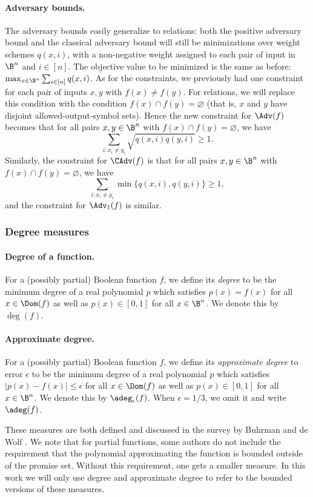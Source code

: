 \paragraph{Adversary bounds.}
The adversary bounds easily generalize to relations:
both the positive adversary bound and the classical adversary
bound will still be minimizations over weight schemes
$q(x,i)$, with a non-negative weight assigned to each pair of
input in $\B^n$ and $i\in[n]$. The objective value to be
minimized is the same as before:
$\max_{x\in\B^n}\sum_{i\in[n]} q(x,i)$.
As for the constraints, we previously had one constraint
for each pair of inputs $x,y$ with $f(x)\ne f(y)$.
For relations, we will replace this condition with the condition
$f(x)\cap f(y)=\varnothing$ (that is, $x$ and $y$ have
disjoint allowed-output-symbol sets). Hence the new constraint
for $\Adv(f)$ becomes that for all pairs $x,y\in\B^n$
with $f(x)\cap f(y)=\varnothing$, we have
\[\sum_{i:x_i\ne y_i}\sqrt{q(x,i)q(y,i)}\ge 1.\]
Similarly, the constraint for $\CAdv(f)$ is that for all pairs
$x,y\in\B^n$ with $f(x)\cap f(y)=\varnothing$, we have
\[\sum_{i:x_i\ne y_i}\min\{q(x,i),q(y,i)\}\ge 1,\]
and the constraint for $\Adv_1(f)$ is similar.



\subsubsection{Degree measures}

\paragraph{Degree of a function.} For a
(possibly partial) Boolean function $f$, we define
its \emph{degree} to be the minimum degree of a real
polynomial $p$ which satisfies $p(x)=f(x)$
for all $x\in\Dom(f)$ as well as $p(x)\in[0,1]$ for
all $x\in\B^n$. We denote this by $\deg(f)$.

\paragraph{Approximate degree.} For a (possibly partial)
Boolean function $f$, we define its \emph{approximate degree}
to error $\epsilon$
to be the minimum degree of a real polynomial $p$
which satisfies $|p(x)-f(x)|\le \epsilon$
for all $x\in\Dom(f)$
as well as $p(x)\in[0,1]$ for all $x\in\B^n$.
We denote this by $\adeg_\epsilon(f)$.
When $\epsilon=1/3$, we omit it and write $\adeg(f)$.

These measures are both defined and discussed in the
survey by Buhrman and de Wolf \cite{BdW02}.
We note that for partial functions, some authors do not
include the requirement that the polynomial approximating
the function is bounded outside of the promise set.
Without this requirement, one gets a smaller measure.
In this work we will only use degree and approximate
degree to refer to the bounded versions of these measures.

